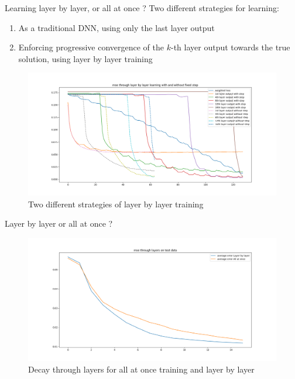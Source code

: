 \documentclass{beamer}
\begin{document}
\begin{frame}{Learning layer by layer, or all at once ?}
    Two different strategies for learning:
    \begin{enumerate}
        \item As a traditional DNN, using only the last layer output
        \item Enforcing progressive convergence of the $k$-th layer output towards the true solution, using layer by layer training
    \end{enumerate}
    \begin{figure}
        \centering
        \includegraphics[width=\textwidth]{double_step_comparison_mse_lowdim_bs10_ep4.png}
        \caption{Two different strategies of layer by layer training}
        \label{fig:my_label}
    \end{figure}
\end{frame}

\begin{frame}{Layer by layer or all at once ?}
    \begin{figure}
        \centering
        \includegraphics[width=\textwidth]{test_lbl_slow_last.png}
        \caption{Decay through layers for all at once training and layer by layer}
        \label{fig:my_label}
    \end{figure}
\end{frame}
\end{document}
